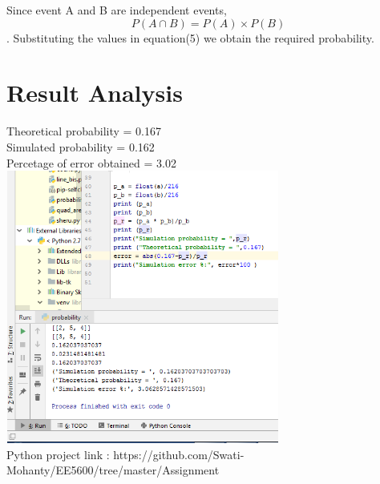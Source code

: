 \documentclass[journal,12pt,twocolumn]{IEEEtran}
\begin{document}
Since event A and B are independent events, \[P(A\cap B) = P(A) \times P(B)\] .
Substituting the values in equation(5) we obtain the required probability.
\section{Result Analysis}
Theoretical probability = 0.167
\\Simulated probability = 0.162
\\Percetage of error obtained = 3.02%
\\\includegraphics[width=9cm, height=9cm]{simulation result.png}
\\Python project link : 
https://github.com/Swati-Mohanty/EE5600/tree/master/Assignment%
\end{document}
